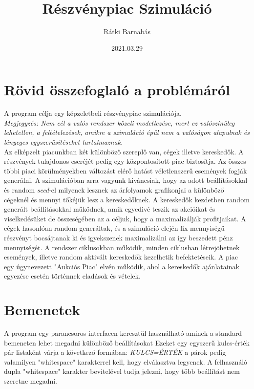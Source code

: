\documentclass{article}[12pt,a4paper]
\title{Részvénypiac Szimuláció}
\author{Rátki Barnabás}
\date{2021.03.29}
\begin{document}
    \maketitle

    \section{Rövid összefoglaló a problémáról}\label{sec:description}
    A program célja egy képzeletbeli részvénypiac szimulációja. \\
    \textit{Megjegyzés: Nem cél a valós rendszer közeli modellezése, mert ez valószínűleg lehetetlen, a feltételezések, amikre a szimuláció épül nem a valóságon alapulnak és lényeges egyszerűsítéseket tartalmaznak.}\\
    Az elképzelt piacunkban két különböző szereplő van, cégek illetve kereskedők.
    A részvények tulajdonos-cseréjét pedig egy központosított piac biztosítja.
    Az összes többi piaci körülményekben változást elérő hatást véletlenszerű események fogják generálni.
    A szimulációban arra vagyunk kiváncsiak, hogy az adott beállításokkal és random \textit{seed}-el milyenek lesznek az árfolyamok grafikonjai a különböző cégeknél és mennyi tőkéjük lesz a kereskedőknek.
    A kereskedők kezdetben random generált beállításokkal működnek, amik egyedivé teszik az akcióikat és viselkedésüket de összeségében az a céljuk, hogy a maximalizálják profitjaikat.
    A cégek hasonlóan random generáltak, és a szimuláció elején fix mennyiségű részvényt bocsájtanak ki és igyekszenek maximalizálni az így beszedett pénz mennyiségét.
    A rendszer ciklusokban működik, minden ciklusban létrejöhetnek események, illetve random aktivált kereskedők kezelhetik befektetéseik.
    A piac egy úgynevezett "Aukciós Piac" elvén működik, ahol a kereskedők ajánlatainak egyezése esetén történnek eladások és vételek.

    \section{Bemenetek}
    A program egy parancsoros interfacen keresztül használható aminek a standard bemeneten lehet megadni különböző beállításokat
    Ezeket egy egyszerű kulcs-érték pár listaként várja a következő formában:
    \textit{KULCS=ÉRTÉK} a párok pedig valamilyen "whitespace" karakterrel kell, hogy elválasztva legyenek.
    A felhasználó dupla "whitespace" karakter bevitelével tudja jelezni, hogy több beállítást nem szeretne megadni.
\end{document}
